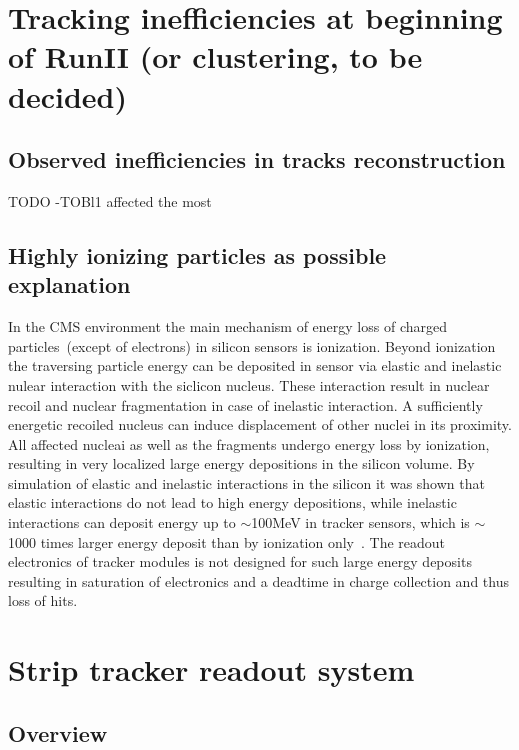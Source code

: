 
\section{Tracking inefficiencies at beginning of RunII (or clustering, to be decided)}

\subsection{Observed inefficiencies in tracks reconstruction}
 TODO
-TOBl1 affected the most

\subsection{Highly ionizing particles as possible explanation}

In the CMS environment the main mechanism of energy loss of charged particles~(except of electrons) in silicon sensors is ionization. Beyond ionization the traversing particle energy can be deposited in sensor via elastic and inelastic nulear interaction with the siclicon nucleus. These interaction result in nuclear recoil and nuclear fragmentation in case of inelastic interaction. A sufficiently energetic recoiled nucleus can induce displacement of other nuclei in its proximity. All affected nucleai as well as the fragments undergo energy loss by ionization, resulting in very localized large energy depositions in the silicon volume. By simulation of elastic and inelastic interactions in the silicon it was shown that elastic interactions do not lead to high energy depositions, while inelastic interactions can deposit energy up to $\sim$100MeV in tracker sensors, which is $\sim$1000 times larger energy deposit than by ionization only~\cite{Huhtinen:2002yda}. The readout electronics of tracker modules is not designed for such large energy deposits resulting in saturation of electronics and a deadtime in charge collection and thus loss of hits.

\section{Strip tracker readout system}

\subsection{Overview}

